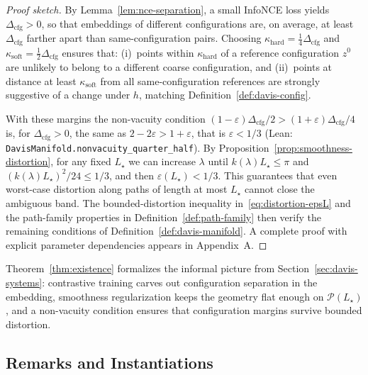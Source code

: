 \documentclass[11pt]{article}
\theoremstyle{remark}
\theoremstyle{plain}
\begin{document}
\begin{proof}[Proof sketch]
By Lemma~\ref{lem:nce-separation}, a small InfoNCE loss yields
$\Delta_{\mathrm{cfg}} > 0$, so that embeddings of different configurations are, on average, at least
$\Delta_{\mathrm{cfg}}$ farther apart than same-configuration pairs. Choosing
$\kappa_{\mathrm{hard}} = \tfrac{1}{4}\Delta_{\mathrm{cfg}}$ and
$\kappa_{\mathrm{soft}} = \tfrac{1}{2}\Delta_{\mathrm{cfg}}$ ensures that:
(i)~points within $\kappa_{\mathrm{hard}}$ of a reference configuration $z^0$ are unlikely to belong
to a different coarse configuration, and (ii)~points at distance at least $\kappa_{\mathrm{soft}}$ from
all same-configuration references are strongly suggestive of a change under $h$,
matching Definition~\ref{def:davis-config}.

With these margins the non-vacuity condition
$(1-\varepsilon)\Delta_{\mathrm{cfg}}/2 > (1+\varepsilon)\Delta_{\mathrm{cfg}}/4$ is, for $\Delta_{\mathrm{cfg}} > 0$,
the same as $2 - 2\varepsilon > 1 + \varepsilon$, that is $\varepsilon < 1/3$ (Lean:
\texttt{DavisManifold.nonvacuity\_quarter\_half}). By Proposition~\ref{prop:smoothness-distortion}, for any
fixed $L_\star$ we can increase $\lambda$ until $k(\lambda)L_\star \le \pi$ and $(k(\lambda)L_\star)^2/24 \le 1/3$,
and then $\varepsilon(L_\star) < 1/3$. This guarantees that even worst-case distortion along paths of length at
most $L_\star$ cannot close the ambiguous band. The bounded-distortion inequality
in~\eqref{eq:distortion-epsL} and the path-family properties in Definition~\ref{def:path-family}
then verify the remaining conditions of Definition~\ref{def:davis-manifold}. A complete proof with
explicit parameter dependencies appears in Appendix~A.
\end{proof}

Theorem~\ref{thm:existence} formalizes the informal picture from
Section~\ref{sec:davis-systems}: contrastive training carves out configuration separation in the
embedding, smoothness regularization keeps the geometry flat enough on $\mathcal{P}(L_\star)$, and
a non-vacuity condition ensures that configuration margins survive bounded distortion.

\subsection{Remarks and Instantiations}
\label{subsec:existence-remarks}
\end{document}
